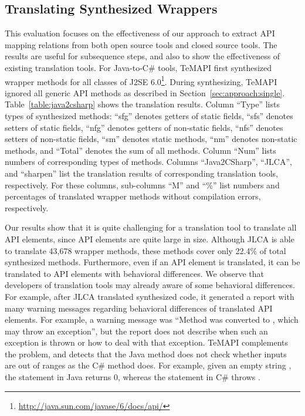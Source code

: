 \subsection{Translating Synthesized Wrappers}
\label{sec:evaluation:element}
This evaluation focuses on the effectiveness of our approach to extract API mapping relations from both open source tools and closed source tools. The results are useful for subsequence steps, and also to show the effectiveness of existing translation tools. For Java-to-C\# tools, TeMAPI first synthesized wrapper methods for all classes of J2SE 6.0\footnote{\url{http://java.sun.com/javase/6/docs/api/}}. During synthesizing,  TeMAPI ignored all generic API methods as described in Section~\ref{sec:approach:single}. Table~\ref{table:java2csharp} shows the translation results. Column ``Type'' lists types of synthesized methods: ``sfg'' denotes getters of static fields, ``sfs'' denotes setters of static fields, ``nfg'' denotes getters of non-static fields, ``nfs'' denotes setters of non-static fields, ``sm'' denotes static methods, ``nm'' denotes non-static methods, and ``Total'' denotes the sum of all methods. Column ``Num'' lists numbers of corresponding types of methods. Columns ``Java2CSharp'', ``JLCA'', and ``sharpen'' list the translation results of corresponding translation tools, respectively. For these columns, sub-columns ``M'' and ``\%'' list numbers and percentages of translated wrapper methods without compilation errors, respectively.

Our results show that it is quite challenging for a translation tool to translate all API elements, since API elements are quite large in size. Although JLCA is able to translate 43,678 wrapper methods, these methods cover only 22.4\% of total synthesized methods. Furthermore, even if an API element is translated, it can be translated to API elements with behavioral differences. We observe that developers of translation tools may already aware of some behavioral differences. For example, after JLCA translated synthesized code, it generated a report with many warning messages regarding behavioral differences of translated API elements. For example, a warning message was ``Method  was converted to , which may throw an exception'', but the report does not describe when such an exception is thrown or how to deal with that exception. TeMAPI complements the problem, and detects that the Java method does not check whether inputs are out of ranges as the C\# method does. For example, given an empty string , the  statement in Java returns 0, whereas the  statement in C\# throws .

